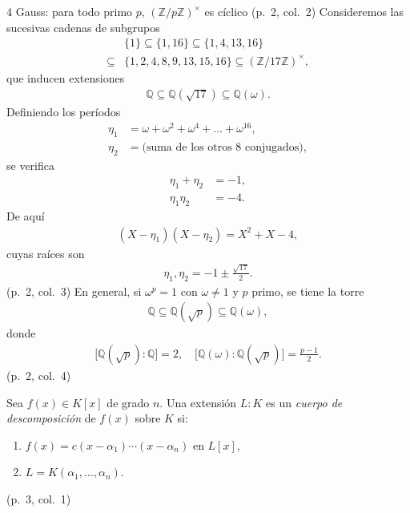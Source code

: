\documentclass[landscape,a4paper]{article}
\begin{document}
\begin{multicols}{4}
Gauss: para todo primo $p$, 
$(\mathbb{Z}/p\mathbb{Z})^{\times}$ es cíclico
(p.~2, col.~2)
Consideremos las sucesivas cadenas de subgrupos
\begin{align*}
&\{1\}\subseteq\{1,16\}\subseteq\{1,4,13,16\}\\\subseteq&\{1,2,4,8,9,13,15,16\}\subseteq(\mathbb{Z}/17\mathbb{Z})^{\times},
\end{align*}
que inducen extensiones
\begin{align*}
\mathbb{Q}\subseteq\mathbb{Q}(\sqrt{17})\subseteq\mathbb{Q}(\omega).
\end{align*}
Definiendo los períodos
\begin{align*}
\eta_{1}&=\omega+\omega^{2}+\omega^{4}+\dots+\omega^{16},\\
\eta_{2}&=\text{(suma de los otros }8\text{ conjugados)},
\end{align*}
se verifica
\begin{align*}
\eta_{1}+\eta_{2}&=-1,\\
\eta_{1}\eta_{2}&=-4.
\end{align*}
De aquí
\begin{align*}
(X-\eta_{1})(X-\eta_{2})=X^{2}+X-4,
\end{align*}
cuyas raíces son
\begin{align*}
\eta_{1},\eta_{2}= -1\pm\frac{\sqrt{17}}{2}.
\end{align*}
(p.~2, col.~3)
En general, si $\omega^{p}=1$ con $\omega\neq 1$ y $p$ primo, se tiene la torre
\begin{align*}
\mathbb{Q}\subseteq\mathbb{Q}(\sqrt{p})\subseteq\mathbb{Q}(\omega),
\end{align*}
donde
\begin{align*}
\bigl[\mathbb{Q}(\sqrt{p}):\mathbb{Q}\bigr]=2,
\quad
\bigl[\mathbb{Q}(\omega):\mathbb{Q}(\sqrt{p})\bigr]=\frac{p-1}{2}.
\end{align*}
(p.~2, col.~4)
\begin{tcolorbox}[title={Definición: Cuerpo de descomposición},colback=white,colframe=blue!80!black,colbacktitle=blue!80!black,coltitle=white]
Sea $f(x)\in K[x]$ de grado $n$. Una extensión $L:K$ es un \emph{cuerpo de descomposición} de $f(x)$ sobre $K$ si:
\begin{enumerate}\itemsep0pt
  \item $f(x)=c(x-\alpha_1)\cdots(x-\alpha_n)$ en $L[x]$,
  \item $L=K(\alpha_1,\dots,\alpha_n)$.
\end{enumerate}
\end{tcolorbox}\hfill(p.~3, col.~1)


\end{multicols}
\end{document}
